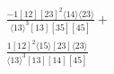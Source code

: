 \documentclass[varwidth, border=5pt]{standalone}
\begin{document}
\begin{my}
$\begin{gathered}
\scriptscriptstyle\frac{-1[12][23]^2⟨14⟩⟨23⟩}{⟨13⟩^3[13][35][45]}+\\
\scriptscriptstyle\frac{1[12]^2⟨15⟩[23]⟨23⟩}{⟨13⟩^3[13][14][45]}\phantom{+}
\end{gathered}$
\end{my}
\end{document}
